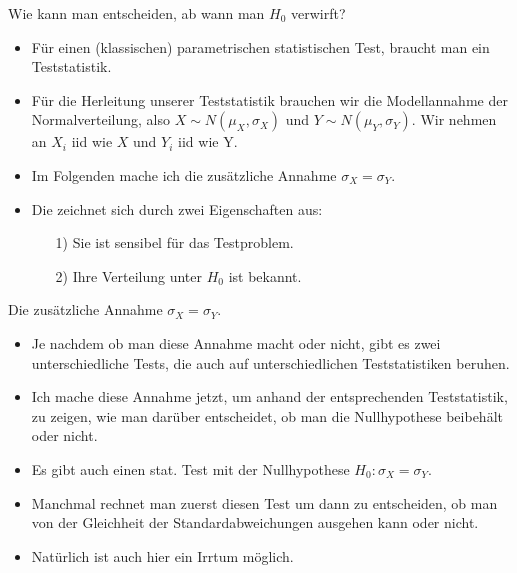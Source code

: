 \documentclass[usenames,dvipsnames,handout]{beamer}
\begin{document}
\begin{frame}{Wie kann man entscheiden, ab wann man $H_{0}$ verwirft?}
\begin{itemize}
\item{Für einen (klassischen) parametrischen statistischen Test, braucht man ein Teststatistik.}\pause
\item{Für die Herleitung unserer Teststatistik brauchen wir die Modellannahme der Normalverteilung,
also $X \sim N(\mu_{X},\sigma_{X})$ und $Y \sim N(\mu_{Y},\sigma_{Y}).$ 
Wir nehmen an $X_{i}$ iid wie $X$ und $Y_{i}$ iid wie Y.}\pause
\item{Im Folgenden mache ich die zusätzliche Annahme $\sigma_{X}=\sigma_{Y}.$}
\item{Die zeichnet sich durch zwei Eigenschaften aus:}
\begin{itemize}
\item[1)]{Sie ist sensibel für das Testproblem.}
\item[2)]{Ihre Verteilung unter $H_{0}$ ist bekannt.}
\end{itemize}
\end{itemize}
\end{frame}

\begin{frame}{Die zusätzliche Annahme $\sigma_{X}=\sigma_{Y}.$}
\begin{itemize}
\item{Je nachdem ob man diese Annahme macht oder nicht, gibt es zwei unterschiedliche Tests,
die auch auf unterschiedlichen Teststatistiken beruhen.}\pause
\item{Ich mache diese Annahme jetzt, um anhand der entsprechenden Teststatistik, zu zeigen,
wie man darüber entscheidet, ob man die Nullhypothese beibehält oder nicht.}\pause
\item{Es gibt auch einen stat. Test mit der Nullhypothese  $H_{0}: \sigma_{X}=\sigma_{Y}.$ }\pause
\item{Manchmal rechnet man zuerst diesen Test um dann zu entscheiden, ob man von der Gleichheit
der Standardabweichungen ausgehen kann oder nicht. }
\item{Natürlich ist auch hier ein Irrtum möglich.}
\end{itemize}
\end{frame}
\end{document}
